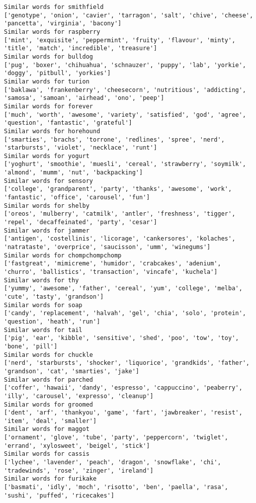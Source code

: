 \documentclass[11pt]{article}
\begin{document}
\begin{Verbatim}[commandchars=\\\{\}]
Similar words for smithfield
['genotype', 'onion', 'cavier', 'tarragon', 'salt', 'chive', 'cheese', 'pancetta', 'virginia', 'bacony']
Similar words for raspberry
['mint', 'exquisite', 'peppermint', 'fruity', 'flavour', 'minty', 'title', 'match', 'incredible', 'treasure']
Similar words for bulldog
['pug', 'boxer', 'chihuahua', 'schnauzer', 'puppy', 'lab', 'yorkie', 'doggy', 'pitbull', 'yorkies']
Similar words for turion
['baklawa', 'frankenberry', 'cheesecorn', 'nutritious', 'addicting', 'samosa', 'samoan', 'airhead', 'ono', 'peep']
Similar words for forever
['much', 'worth', 'awesome', 'variety', 'satisfied', 'god', 'agree', 'question', 'fantastic', 'grateful']
Similar words for horehound
['smarties', 'brachs', 'torrone', 'redlines', 'spree', 'nerd', 'starbursts', 'violet', 'necklace', 'runt']
Similar words for yogurt
['yoghurt', 'smoothie', 'muesli', 'cereal', 'strawberry', 'soymilk', 'almond', 'mumm', 'nut', 'backpacking']
Similar words for sensory
['college', 'grandparent', 'party', 'thanks', 'awesome', 'work', 'fantastic', 'office', 'carousel', 'fun']
Similar words for shelby
['oreos', 'mulberry', 'catmilk', 'antler', 'freshness', 'tigger', 'repel', 'decaffeinated', 'party', 'cesar']
Similar words for jammer
['antigen', 'costellinis', 'licorage', 'cankersores', 'kolaches', 'natrataste', 'overprice', 'saucisson', 'umm', 'winegums']
Similar words for chompchompchomp
['fastgreat', 'mimicreme', 'humidor', 'crabcakes', 'adenium', 'churro', 'ballistics', 'transaction', 'vincafe', 'kuchela']
Similar words for thy
['yummy', 'awesome', 'father', 'cereal', 'yum', 'college', 'melba', 'cute', 'tasty', 'grandson']
Similar words for soap
['candy', 'replacement', 'halvah', 'gel', 'chia', 'solo', 'protein', 'question', 'heath', 'run']
Similar words for tail
['pig', 'ear', 'kibble', 'sensitive', 'shed', 'poo', 'tow', 'toy', 'bone', 'pill']
Similar words for chuckle
['nerd', 'starbursts', 'shocker', 'liquorice', 'grandkids', 'father', 'grandson', 'cat', 'smarties', 'jake']
Similar words for parched
['coffer', 'hawaii', 'dandy', 'espresso', 'cappuccino', 'peaberry', 'illy', 'carousel', 'expresso', 'cleanup']
Similar words for groomed
['dent', 'arf', 'thankyou', 'game', 'fart', 'jawbreaker', 'resist', 'item', 'deal', 'smaller']
Similar words for maggot
['ornament', 'glove', 'tube', 'party', 'peppercorn', 'twiglet', 'errand', 'xylosweet', 'beigel', 'stick']
Similar words for cassis
['lychee', 'lavender', 'peach', 'dragon', 'snowflake', 'chi', 'tradewinds', 'rose', 'zinger', 'ireland']
Similar words for furikake
['basmati', 'idly', 'moch', 'risotto', 'ben', 'paella', 'rasa', 'sushi', 'puffed', 'ricecakes']

\end{Verbatim}
\end{document}
